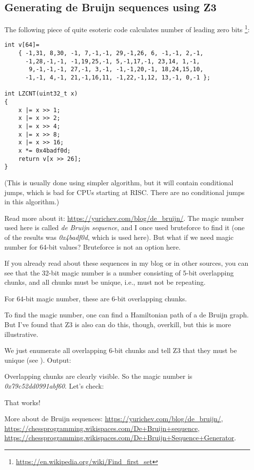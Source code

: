 \subsection{Generating de Bruijn sequences using Z3}

The following piece of quite esoteric code calculates number of leading zero bits
\footnote{\url{https://en.wikipedia.org/wiki/Find_first_set}}:

\begin{lstlisting}
int v[64]=
	{ -1,31, 8,30, -1, 7,-1,-1, 29,-1,26, 6, -1,-1, 2,-1,
	  -1,28,-1,-1, -1,19,25,-1, 5,-1,17,-1, 23,14, 1,-1,
	   9,-1,-1,-1, 27,-1, 3,-1, -1,-1,20,-1, 18,24,15,10,
	  -1,-1, 4,-1, 21,-1,16,11, -1,22,-1,12, 13,-1, 0,-1 };

int LZCNT(uint32_t x)
{
    x |= x >> 1;
    x |= x >> 2;
    x |= x >> 4;
    x |= x >> 8;
    x |= x >> 16;
    x *= 0x4badf0d;
    return v[x >> 26];
}
\end{lstlisting}

(This is usually done using simpler algorithm, but it will contain conditional jumps, which is bad for
CPUs starting at RISC. There are no conditional jumps in this algorithm.)

Read more about it: \url{https://yurichev.com/blog/de_bruijn/}.
The magic number used here is called \textit{de Bruijn sequence},
and I once used bruteforce to find it (one of the results was \textit{0x4badf0d}, which is used here).
But what if we need magic number for 64-bit values?
Bruteforce is not an option here.

If you already read about these sequences in my blog or in other sources,
you can see that the 32-bit magic number is a number consisting
of 5-bit overlapping chunks, and all chunks must be unique, i.e., must not be repeating.

For 64-bit magic number, these are 6-bit overlapping chunks.

To find the magic number, one can find a Hamiltonian path of a de Bruijn graph.
But I've found that Z3 is also can do this, though, overkill, but this is more illustrative.



We just enumerate all overlapping 6-bit chunks and tell Z3 that they must be unique (see ).
Output:



Overlapping chunks are clearly visible.
So the magic number is \textit{0x79c52dd0991abf60}.
Let's check:



That works!

More about de Bruijn sequences:
\url{https://yurichev.com/blog/de_bruijn/},
\url{https://chessprogramming.wikispaces.com/De+Bruijn+sequence},
\url{https://chessprogramming.wikispaces.com/De+Bruijn+Sequence+Generator}.

